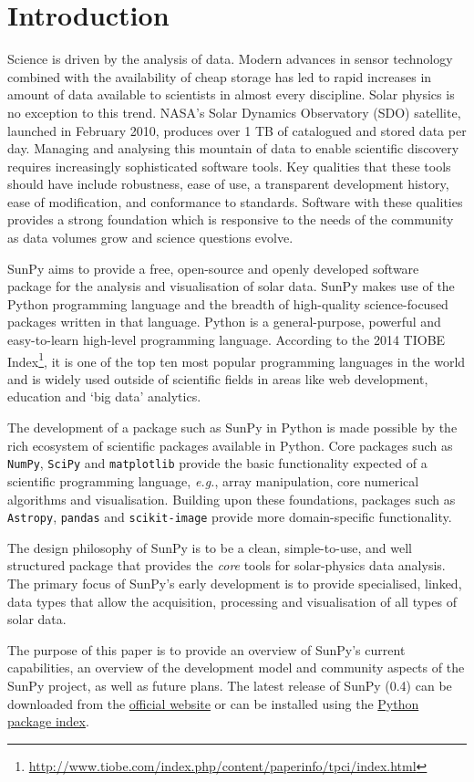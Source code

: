 \section{Introduction}\label{sec:Intro}

Science is driven by the analysis of data. Modern advances in sensor
technology combined with the availability of cheap storage has led to
rapid increases in amount of data available to scientists in almost
every discipline.  Solar physics is no exception to this trend. NASA's
Solar Dynamics Observatory (SDO) satellite, launched in February 2010,
produces over 1 TB of catalogued and stored data per day. Managing and
analysing this mountain of data to enable scientific discovery
requires increasingly sophisticated software tools.  Key qualities
that these tools should have include robustness, ease of use, a
transparent development history, ease of modification, and conformance
to standards.  Software with these qualities provides a strong
foundation which is responsive to the needs of the community as data
volumes grow and science questions evolve.

SunPy aims to provide a free, open-source and openly developed software package 
for the analysis and visualisation of solar data. SunPy makes use of the Python 
programming language and the breadth of high-quality science-focused packages 
written in that language. Python is a general-purpose, 
powerful and easy-to-learn high-level programming language.
According to the 2014 TIOBE Index\footnote{\url{http://www.tiobe.com/index.php/content/paperinfo/tpci/index.html}},
 it is one of the top ten most popular programming languages in the world 
and is widely used outside of scientific fields in areas like web development, education 
and `big data' analytics.


The development of a package such as SunPy in Python is made possible by the 
rich ecosystem of scientific packages available in Python. Core packages such as \texttt{NumPy}, \texttt{SciPy} and \texttt{matplotlib} 
provide the basic functionality expected of a scientific programming language,
\textit{e.g.}, array manipulation, core numerical algorithms and visualisation. 
Building upon these foundations, packages such as \texttt{Astropy}, \texttt{pandas} and 
\texttt{scikit-image} provide more domain-specific functionality.

The design philosophy of SunPy is to be a clean, simple-to-use, and well 
structured package that provides the \textit{core} tools for solar-physics data 
analysis. The primary focus of SunPy's early development is to provide 
specialised, linked, data types that allow the acquisition, processing and 
visualisation of all types of solar data.

The purpose of this paper is to provide an overview of SunPy's current 
capabilities, an overview of the development model and community aspects of the 
SunPy project, as well as future plans. The latest release of SunPy (0.4)
can be downloaded from the \href{http://sunpy.org}{official website} or can be
installed using the \href{http://pypi.python.org/pypi}{Python package index}.
